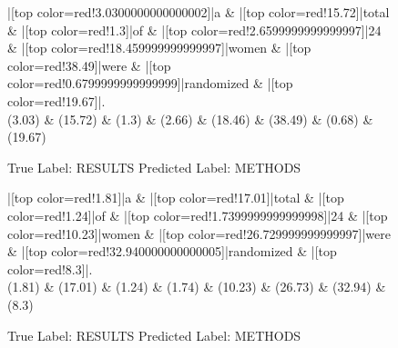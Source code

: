 \documentclass[a4paper, landscape]{article}
\begin{document}
\clearpage
\begin{figure}
\begin{center}
\begin{dependency}
\begin{deptext}
|[top color=red!3.0300000000000002]|a \& |[top color=red!15.72]|total \& |[top color=red!1.3]|of \& |[top color=red!2.6599999999999997]|24 \& |[top color=red!18.459999999999997]|women \& |[top color=red!38.49]|were \& |[top color=red!0.6799999999999999]|randomized \& |[top color=red!19.67]|.\\
(3.03) \& (15.72) \& (1.3) \& (2.66) \& (18.46) \& (38.49) \& (0.68) \& (19.67)\\
\end{deptext}
\end{dependency}
\end{center}
\caption{True Label: RESULTS Predicted Label: METHODS}
\end{figure}
\clearpage
\begin{figure}
\begin{center}
\begin{dependency}
\begin{deptext}
|[top color=red!1.81]|a \& |[top color=red!17.01]|total \& |[top color=red!1.24]|of \& |[top color=red!1.7399999999999998]|24 \& |[top color=red!10.23]|women \& |[top color=red!26.729999999999997]|were \& |[top color=red!32.940000000000005]|randomized \& |[top color=red!8.3]|.\\
(1.81) \& (17.01) \& (1.24) \& (1.74) \& (10.23) \& (26.73) \& (32.94) \& (8.3)\\
\end{deptext}
\end{dependency}
\end{center}
\caption{True Label: RESULTS Predicted Label: METHODS}
\end{figure}
\clearpage
\end{document}
